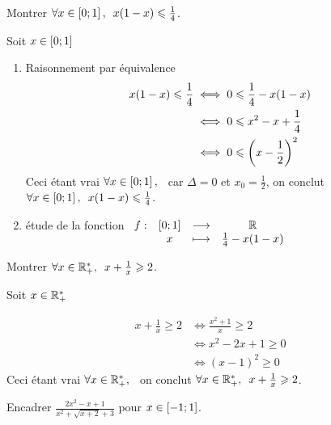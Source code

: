 \begin{exoex}
	Montrer \(\quantifs{\forall x \in \intervii{0}{1}} x(1-x) \leq \frac{1}{4}\).
\end{exoex}

\begin{corr}[2 Méthode]
	Soit \(x \in \left[0;1\right] \)
	\begin{enumerate}
		\item Raisonnement par équivalence
		      \[\begin{aligned}
				      x(1-x) \leqslant \frac{1}{4} & \iff 0 \leqslant \frac{1}{4}-x(1-x)     \\
				                              & \iff 0\leqslant x^2 -x +  \frac{1}{4}   \\
				                              & \iff 0\leqslant\left(x- \frac{1}{2}\right)^2
			      \end{aligned}
		      \]
		      Ceci étant vrai \(\quantifs{\forall x\in \intervii{0}{1}}\) car \(\Delta = 0\) et \(x_0 =  \frac{1}{2}\), on conclut \(\quantifs{\forall x \in \intervii{0}{1}} x(1-x) \leq \frac{1}{4}\).\\
		\item étude de la fonction \(\begin{array}[t]{cccc}f : & \left[0;1\right] & \longrightarrow & \mathbb{R} \\ & x & \longmapsto & \frac{1}{4}-x(1-x)\end{array}\)\\
	\end{enumerate}
\end{corr}


\begin{exoex}
	Montrer \(\quantifs{\forall x \in \Rps} x+\frac{1}{x}\geq 2\).
\end{exoex}

\begin{corr}
	Soit \(x \in \mathbb{R}_+^* \)

	\[\begin{aligned}
			x+\frac{1}{x}\geq 2 & \iff \frac{x^2+1}{x}\geq 2 \\
			                    & \iff x^2-2x+1\geq    0     \\
			                    & \iff (x-1)^2 \geq 0
		\end{aligned}
	\]
	Ceci étant vrai \(\quantifs{\forall x\in \Rps}\) on conclut \(\quantifs{\forall x \in \Rps} x+\frac{1}{x}\geq 2\).
\end{corr}

\begin{exoex}
	Encadrer \(\frac{2x^2-x+1}{x^2+\sqrt{x+2}+3}\) pour \(x \in \left[-1;1\right]\).
\end{exoex}

